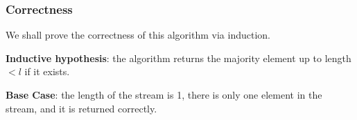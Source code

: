 \documentclass{article}
\begin{document}
\newpage

\subsubsection{Correctness}

%
%
%
%
%


We shall prove the correctness of this algorithm via induction.

\textbf{Inductive hypothesis}: the algorithm returns the majority element up to
length \(< l\) if it exists.

\textbf{Base Case}: the length of the stream is 1, there is only one element
in the stream, and it is returned correctly.
\end{document}
